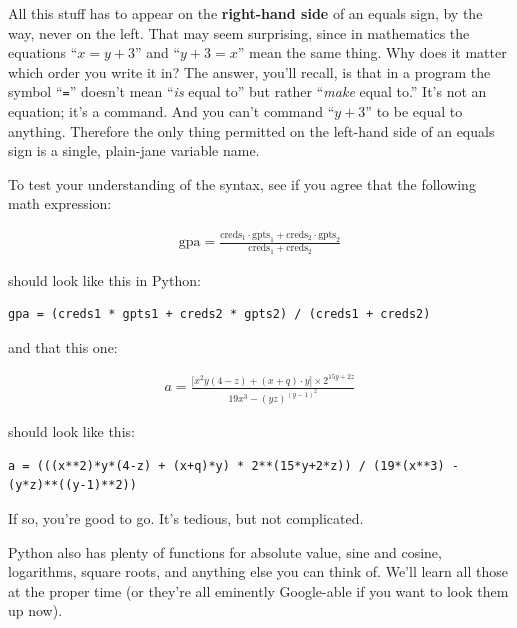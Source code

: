 All this stuff has to appear on the \textbf{right-hand side} of an equals sign,
by the way, never on the left. That may seem surprising, since in mathematics
the equations ``$x = y + 3$'' and ``$y + 3 = x$'' mean the same thing. Why does
it matter which order you write it in? The answer, you'll recall, is that in a
program the symbol ``\texttt{=}'' doesn't mean ``\textit{is} equal to'' but
rather ``\textit{make} equal to.'' It's not an equation; it's a command. And
you can't command ``$y+3$'' to be equal to anything. Therefore the only thing
permitted on the left-hand side of an equals sign is a single, plain-jane
variable name.

To test your understanding of the syntax, see if you agree that the following
math expression:

\begin{align*}
\textrm{gpa} = \frac{
\textrm{creds}_1 \cdot \textrm{gpts}_1 +
\textrm{creds}_2 \cdot \textrm{gpts}_2}
{\textrm{creds}_1 + \textrm{creds}_2}
\end{align*}

should look like this in Python:

\begin{Verbatim}[fontsize=\footnotesize,samepage=true,frame=single,framesep=3mm]
gpa = (creds1 * gpts1 + creds2 * gpts2) / (creds1 + creds2)
\end{Verbatim}

and that this one:

\begin{align*}
a = \frac{\lbrack x^2y(4-z) + (x+q)\cdot y \rbrack \times 2^{15y+2z}}
{19x^3 - (yz)^{(y-1)^2}}
\end{align*}

should look like this:

\begin{Verbatim}[fontsize=\tiny,samepage=true,frame=single,framesep=3mm]
a = (((x**2)*y*(4-z) + (x+q)*y) * 2**(15*y+2*z)) / (19*(x**3) - (y*z)**((y-1)**2))
\end{Verbatim}

\vspace{-.15in}

If so, you're good to go. It's tedious, but not complicated.

Python also has plenty of functions for absolute value, sine and cosine,
logarithms, square roots, and anything else you can think of. We'll learn all
those at the proper time (or they're all eminently Google-able if you want to
look them up now).

